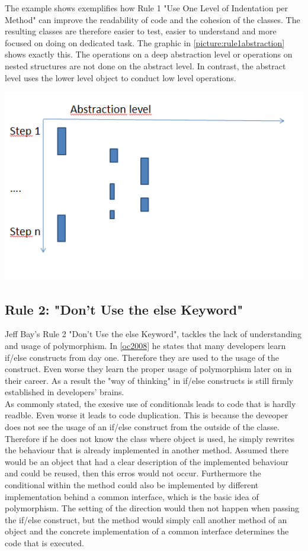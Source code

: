The example shows exemplifies how Rule 1 "Use One Level of Indentation per Method" can improve the readability of code and the cohesion of the classes. The resulting classes are therefore easier to test, easier to understand and more focused on doing on dedicated task. The graphic in \ref{picture:rule1abstraction} shows exactly this. The operations on a deep abstraction level or operations on nested structures are not done on the abstract level. In contrast, the abstract level uses the lower level object to conduct low level operations. 

\includegraphics{Bilder/Rule1Abstraction.PNG}
\label{picture:rule1abstraction}

\subsection{Rule 2: "Don’t Use the else Keyword"}
\label{describe:rule2}
Jeff Bay's Rule 2 "Don’t Use the else Keyword", tackles the lack of understanding and usage of polymorphism. 
In \ref{oc2008} he states that many developers learn if/else constructs from day one. Therefore they are used to the usage of the construct. Even worse they learn the proper usage of polymorphism later on in their career. As a result the "way of thinking" in if/else constructs is still firmly established in developers' brains.
\\

As commonly stated, the exesive use of conditionals leads to code that is hardly readble. Even worse it leads to code duplication. This is because the deveoper does not see the usage of an if/else construct from the outside of the classe. Therefore if he does not know the class where object is used, he simply rewrites the behaviour that is already implemented in another method. Assumed there would be an object that had a clear description of the implemented behaviour and could be reused, then this erros would not occur. Furthermore the conditional within the method could also be implemented by different implementation behind a common interface, which is the basic idea of polymorphism. The setting of the direction would then not happen when passing the if/else construct, but the method would simply call another method of an object and the concrete implementation of a common interface determines the code that is executed. 
\\


